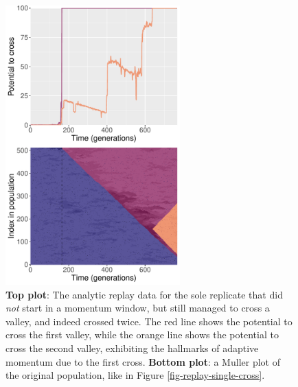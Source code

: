 \begin{figure}[h!]
\begin{center}
\includegraphics[width=0.6\textwidth]{05_adaptive_momentum/media/reps/no_am_two_cross/script_06__plot_02__combined_plot.pdf}
\caption{
    \textbf{Top plot}: The analytic replay data for the sole replicate that did \textit{not} start in a momentum window, but still managed to cross a valley, and indeed crossed twice. 
    The red line shows the potential to cross the first valley, while the orange line shows the potential to cross the second valley, exhibiting the hallmarks of adaptive momentum due to the first cross. 
    \textbf{Bottom plot}: a Muller plot of the original population, like in Figure \ref{fig-replay-single-cross}.
}
\label{fig-replay-no-window}
\end{center}
\end{figure}

